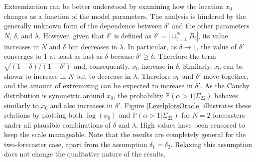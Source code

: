 \documentclass[11pt]{article}
\renewcommand{\P}{\mathbb{P}}
\theoremstyle{definition}
\theoremstyle{definition}
\def\P{{\mathbb P}}
\begin{document}
Extremization can be better understood by examining how the location $x_0$ changes as a function of the model parameters. The analysis is hindered by the generally unknown form of the dependence between $\delta'$ and the other parameters $N$, $\delta$, and $\lambda$. However, given that $\delta'$ is defined as $\delta' = |\cup_{i=1}^N B_i|$, its value  increases in $N$ and $\delta$ but decreases in $\lambda$. In particular, as $\delta \to 1$, the value of $\delta'$ converges to $1$ at least as fast as $\delta$ because  $\delta' \geq \delta$. Therefore the term $\sqrt{(1-\delta)/(1-\delta')}$ and, consequently, $x_0$ increase in $\delta$. Similarly, $x_0$ can be shown to increase in $N$ but to decrease in $\lambda$. Therefore $x_0$ and $\delta'$ move together, and the amount of extremizing
can be expected to increase in $\delta'$.  As the Cauchy distribution is symmetric around $x_0$, the probability $\P(\alpha > 1 | \Sigma_{22})$ behaves similarly to $x_0$ and also increases in $\delta'$.  
Figure \ref{LevelplotsOracle} illustrates these relations by plotting both $\log(x_0)$ and $\P(\alpha > 1 | \Sigma_{22})$ for $N = 2$ forecasters under all plausible combinations of $\delta$ and $\lambda$. High values have been censored to keep the scale manageable. Note that the results are completely general for the two-forecaster case, apart from the assumption $\delta_1 = \delta_2$. Relaxing this assumption does not change the qualitative nature of the results.
\end{document}
